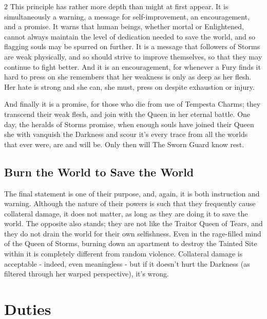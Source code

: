 \begin{multicols}{2}
This principle has rather more depth than might at first appear. It is simultaneously a warning, a message for self-improvement, an encouragement, and a promise. It warns that human beings, whether mortal or Enlightened, cannot always maintain the level of dedication needed to save the world, and so flagging souls may be spurred on further. It is a message that followers of Storms are weak physically, and so should strive to improve themselves, so that they may continue to fight better. And it is an encouragement, for whenever a Fury finds it hard to press on she remembers that her weakness is only as deep as her flesh. Her hate is strong and she can, she must, press on despite exhaustion or injury.

And finally it is a promise, for those who die from use of Tempesta Charms; they transcend their weak flesh, and join with the Queen in her eternal battle. One day, the heralds of Storms promise, when enough souls have joined their Queen she with vanquish the Darkness and scour it's every trace from all the worlds that ever were, are and will be. Only then will The Sworn Guard know rest.  

\subsection*{Burn the World to Save the World}

The final statement is one of their purpose, and, again, it is both instruction and warning. Although the nature of their powers is such that they frequently cause collateral damage, it does not matter, as long as they are doing it to save the world. The opposite also stands; they are not like the Traitor Queen of Tears, and they do not drain the world for their own selfishness. Even in the rage-filled mind of the Queen of Storms, burning down an apartment to destroy the Tainted Site within it is completely different from random violence. Collateral damage is acceptable - indeed, even meaningless - but if it doesn't hurt the Darkness (as filtered through her warped perspective), it's wrong. 

\section*{Duties}


\end{multicols}
